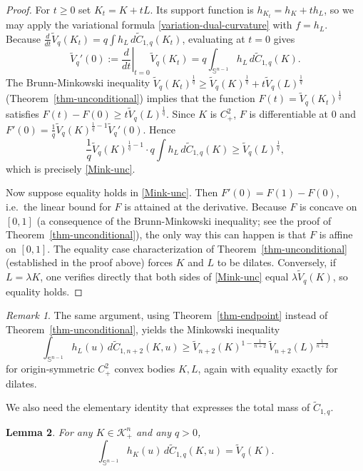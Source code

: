 \documentclass[12pt,leqno]{amsart}
\theoremstyle{plain} \newtheorem{thm}{Theorem}[section]
\theoremstyle{plain} \newtheorem{prop}[thm]{Proposition}
\theoremstyle{plain} \newtheorem{prob}[thm]{Problem}
\theoremstyle{definition} \newtheorem{defi}[thm]{Definition}
\theoremstyle{plain} \newtheorem{cor}[thm]{Corollary}
\theoremstyle{plain} \newtheorem{lem}[thm]{Lemma}
\theoremstyle{plain} \newtheorem{eg}{Example}[section]
\theoremstyle{remark} \newtheorem{rmk}[thm]{Remark}
\theoremstyle{plain} \newtheorem{conj}{Conjecture}
\numberwithin{equation}{section}
\newcommand{\cK}{\mathcal{K}}
\newcommand{\tV}{\widetilde V}
\newcommand{\tC}{\widetilde C}
\begin{document}
\begin{proof}
  For $t\ge0$ set $K_t=K+tL$.  Its support function is
  $h_{K_t}=h_K+t h_L$, so we may apply the variational formula
  \eqref{variation-dual-curvature} with $f=h_L$.  Because
  $\frac{d}{dt}\tV_q(K_t)=q\int h_L\,d\tC_{1,q}(K_t)$, evaluating at
  $t=0$ gives
  \[
    \tV_q'(0):=\left.\frac{d}{dt}\right|_{t=0}\tV_q(K_t)
    =q\int_{\mathbb S^{n-1}} h_L\,d\tC_{1,q}(K).
  \]
  The Brunn-Minkowski inequality
  $\tV_q(K_t)^{\frac1q}\ge\tV_q(K)^{\frac1q}+t\tV_q(L)^{\frac1q}$
  (Theorem~\ref{thm-unconditional}) implies that the function
  $F(t)=\tV_q(K_t)^{\frac1q}$ satisfies
  $F(t)-F(0)\ge t\tV_q(L)^{\frac1q}$.  Since $K$ is $C^2_+$, $F$ is
  differentiable at $0$ and
  $F'(0)=\frac1q\tV_q(K)^{\frac1q-1}\tV_q'(0)$.  Hence
  \[
    \frac1q\tV_q(K)^{\frac1q-1}\cdot q\int h_L\,d\tC_{1,q}(K)
    \ge\tV_q(L)^{\frac1q},
  \]
  which is precisely \eqref{Mink-unc}.

  Now suppose equality holds in \eqref{Mink-unc}.  Then
  $F'(0)=F(1)-F(0)$, i.e.\ the linear bound for $F$ is attained at the
  derivative.  Because $F$ is concave on $[0,1]$ (a consequence of the
  Brunn-Minkowski inequality; see the proof of
  Theorem~\ref{thm-unconditional}), the only way this can happen is
  that $F$ is affine on $[0,1]$.  The equality case characterization
  of Theorem~\ref{thm-unconditional} (established in the proof above)
  forces $K$ and $L$ to be dilates.
  Conversely, if $L=\lambda K$, one verifies directly that both sides
  of \eqref{Mink-unc} equal $\lambda\tV_q(K)$, so equality holds.
\end{proof}

\begin{rmk}
  The same argument, using Theorem~\ref{thm-endpoint} instead of
  Theorem~\ref{thm-unconditional}, yields the Minkowski inequality
  \begin{equation}\label{Mink-endpoint}
    \int_{\mathbb S^{n-1}} h_L(u)\,d\tC_{1,n+2}(K,u)
    \ge \tV_{n+2}(K)^{1-\frac1{n+2}}\,\tV_{n+2}(L)^{\frac1{n+2}}
  \end{equation}
  for origin‑symmetric $C^2_+$ convex bodies $K,L$, again with equality
  exactly for dilates.
\end{rmk}

We also need the elementary identity that expresses the total mass of
$\tC_{1,q}$.

\begin{lem}\label{lem-totalmass}
  For any $K\in\cK_+^n$ and any $q>0$,
  \begin{equation}\label{totalmass}
    \int_{\mathbb S^{n-1}} h_K(u)\,d\tC_{1,q}(K,u)=\tV_q(K).
  \end{equation}
\end{lem}
\end{document}
